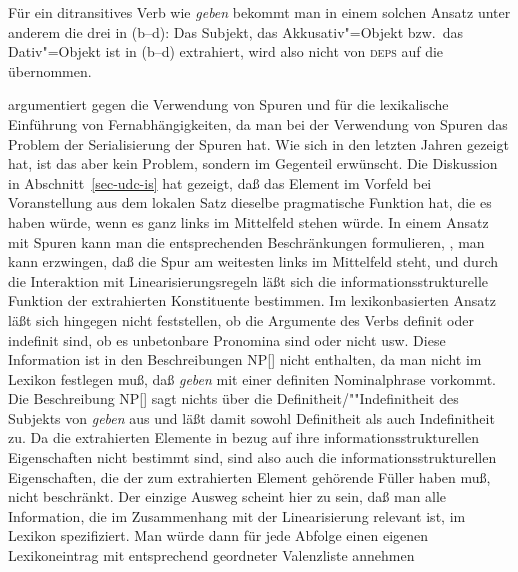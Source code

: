 \noindent
Für ein ditransitives Verb wie \emph{geben} bekommt man in einem solchen Ansatz
unter anderem die drei \subcatlen in (b--d):
\eal
\ex {}
\ex {}
\ex {}
\ex {}
\zl
Das Subjekt, das Akkusativ"=Objekt bzw.\ das Dativ"=Objekt ist in (b--d) extrahiert, wird
also nicht von \textsc{deps} auf die \subcatl übernommen.

\citet[--148]{Nerbonne94a} argumentiert gegen die Verwendung von Spuren und für
die lexikalische Einführung von Fernabhängigkeiten, da man bei der Verwendung von Spuren
das Problem der Serialisierung der Spuren hat. Wie sich in den letzten Jahren gezeigt hat,
ist das aber kein Problem, sondern im Gegenteil erwünscht.
Die Diskussion in Abschnitt~\ref{sec-udc-is} hat gezeigt, daß das Element im Vorfeld
bei Voranstellung aus dem lokalen Satz dieselbe pragmatische Funktion hat, die es
haben würde, wenn es ganz links im Mittelfeld stehen würde. In einem Ansatz mit Spuren kann
man die entsprechenden Beschränkungen formulieren, \dash, man kann erzwingen, daß die
Spur am weitesten links im Mittelfeld steht, und durch die Interaktion mit Linearisierungsregeln
läßt sich die informationsstrukturelle Funktion der extrahierten Konstituente bestimmen.
Im lexikonbasierten Ansatz läßt sich hingegen nicht feststellen, ob die Argumente
des Verbs definit oder indefinit sind, ob es unbetonbare Pronomina sind oder nicht usw.
Diese Information ist in den Beschreibungen NP[] nicht enthalten, da man nicht im
Lexikon festlegen muß, daß \emph{geben} mit einer definiten Nominalphrase vorkommt. Die Beschreibung
NP[] sagt nichts über die Definitheit/""Indefinitheit des Subjekts von \emph{geben} aus
und läßt damit sowohl Definitheit als auch Indefinitheit zu.
Da die extrahierten Elemente in bezug auf ihre informationsstrukturellen Eigenschaften nicht
bestimmt sind, sind also auch die informationsstrukturellen Eigenschaften, die der zum extrahierten
Element gehörende Füller haben muß, nicht beschränkt.
Der einzige Ausweg scheint hier zu sein, daß man alle Information, die im Zusammenhang
mit der Linearisierung relevant ist, im Lexikon spezifiziert. Man würde dann für jede
Abfolge einen eigenen Lexikoneintrag mit entsprechend geordneter Valenzliste annehmen
